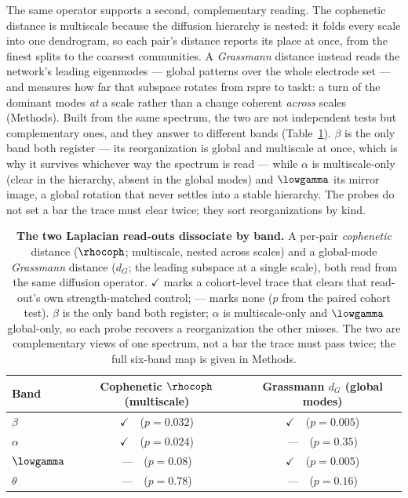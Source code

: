 The same operator supports a second, complementary reading. The cophenetic distance is multiscale because the diffusion hierarchy is nested: it folds every scale into one dendrogram, so each pair's distance reports its place at once, from the finest splits to the coarsest communities. A \emph{Grassmann} distance instead reads the network's leading eigenmodes --- global patterns over the whole electrode set --- and measures how far that subspace rotates from \acrshort{rspre} to \acrshort{taskt}: a turn of the dominant modes \emph{at} a scale rather than a change coherent \emph{across} scales (Methods). Built from the same spectrum, the two are not independent tests but complementary ones, and they answer to different bands (Table~\ref{tab:probe_band}). \(\beta\) is the only band both register --- its reorganization is global and multiscale at once, which is why it survives whichever way the spectrum is read --- while \(\alpha\) is multiscale-only (clear in the hierarchy, absent in the global modes) and \(\lowgamma\) its mirror image, a global rotation that never settles into a stable hierarchy. The probes do not set a bar the trace must clear twice; they sort reorganizations by kind.

%
\begin{table}[t]
    \centering
    \caption{\textbf{The two Laplacian read-outs dissociate by band.} A per-pair \emph{cophenetic} distance (\(\rhocoph\); multiscale, nested across scales) and a global-mode \emph{Grassmann} distance (\(d_{G}\); the leading subspace at a single scale), both read from the same diffusion operator. \(\checkmark\) marks a cohort-level trace that clears that read-out's own strength-matched control; --- marks none (\(p\) from the paired cohort test). \(\beta\) is the only band both register; \(\alpha\) is multiscale-only and \(\lowgamma\) global-only, so each probe recovers a reorganization the other misses. The two are complementary views of one spectrum, not a bar the trace must pass twice; the full six-band map is given in Methods.}
    \label{tab:probe_band}
    \begin{tabular}{lcc}
        \toprule
        Band & Cophenetic \(\rhocoph\) (multiscale) & Grassmann \(d_{G}\) (global modes) \\
        \midrule
        \(\beta\)     & \(\checkmark\)~~(\(p = 0.032\)) & \(\checkmark\)~~(\(p = 0.005\)) \\
        \(\alpha\)    & \(\checkmark\)~~(\(p = 0.024\)) & ---~~(\(p = 0.35\)) \\
        \(\lowgamma\) & ---~~(\(p = 0.08\))            & \(\checkmark\)~~(\(p = 0.005\)) \\
        \(\theta\)    & ---~~(\(p = 0.78\))            & ---~~(\(p = 0.16\)) \\
        \bottomrule
    \end{tabular}
\end{table}
